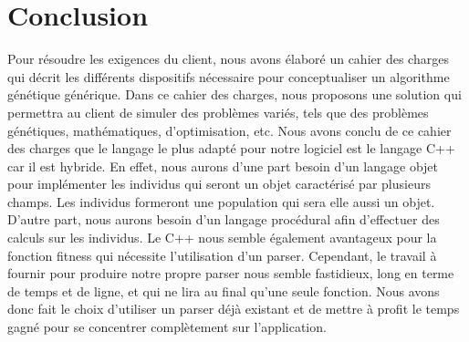 \documentclass[a4paper,11pt]{article}
\begin{document}
	\section{Conclusion}
		Pour résoudre les exigences du client, nous avons élaboré un cahier des charges qui décrit les différents dispositifs nécessaire pour conceptualiser un algorithme génétique générique. Dans ce cahier des charges, nous proposons une solution qui permettra au client de simuler des problèmes variés, tels que des problèmes génétiques, mathématiques, d’optimisation, etc.
		Nous avons conclu de ce cahier des charges que le langage le plus adapté pour notre logiciel est le langage C++ car il est hybride.
		En effet, nous aurons d’une part besoin d’un langage objet pour implémenter les individus qui seront un objet caractérisé par plusieurs champs. Les individus formeront une population qui sera elle aussi un objet. 
		D’autre part, nous aurons besoin d’un langage procédural afin d’effectuer des calculs sur les individus. Le C++ nous semble également avantageux pour la fonction fitness qui nécessite l'utilisation d'un parser.
		Cependant, le travail à fournir pour produire notre propre parser nous semble fastidieux, long en terme de temps et de ligne, et qui ne lira au final qu'une seule fonction. Nous avons donc fait le choix d'utiliser un parser déjà existant et de mettre à profit le temps gagné pour se concentrer complètement sur l'application.
	
\end{document}
